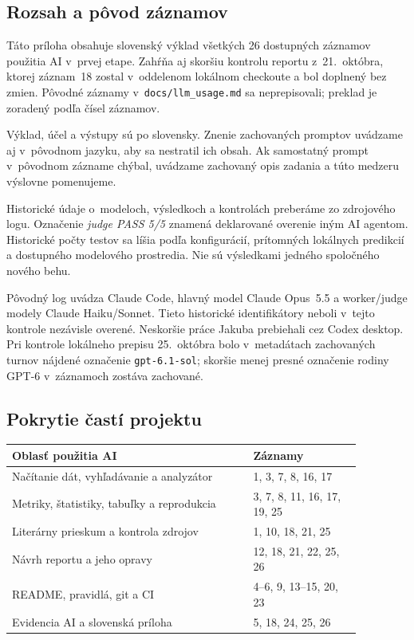 \begingroup
\normalsize
\setlength{\parindent}{0pt}
\subsection*{Rozsah a pôvod záznamov}
Táto príloha obsahuje slovenský výklad všetkých 26 dostupných záznamov použitia AI v~prvej etape. Zahŕňa aj skoršiu kontrolu reportu z~21.~októbra, ktorej záznam~18 zostal v~oddelenom lokálnom checkoute a bol doplnený bez zmien. Pôvodné záznamy v~\texttt{docs/llm\_usage.md} sa neprepisovali; preklad je zoradený podľa čísel záznamov.

Výklad, účel a výstupy sú po slovensky. Znenie zachovaných promptov uvádzame aj v~pôvodnom jazyku, aby sa nestratil ich obsah. Ak samostatný prompt v~pôvodnom zázname chýbal, uvádzame zachovaný opis zadania a túto medzeru výslovne pomenujeme.

Historické údaje o~modeloch, výsledkoch a kontrolách preberáme zo zdrojového logu. Označenie \emph{judge PASS 5/5} znamená deklarované overenie iným AI agentom. Historické počty testov sa líšia podľa konfigurácií, prítomných lokálnych predikcií a dostupného modelového prostredia. Nie sú výsledkami jedného spoločného nového behu.

Pôvodný log uvádza Claude Code, hlavný model Claude Opus~5.5 a worker/judge modely Claude Haiku/Sonnet. Tieto historické identifikátory neboli v~tejto kontrole nezávisle overené. Neskoršie práce Jakuba prebiehali cez Codex desktop. Pri kontrole lokálneho prepisu 25.~októbra bolo v~metadátach zachovaných turnov nájdené označenie \texttt{gpt-6.1-sol}; skoršie menej presné označenie rodiny GPT-6 v~záznamoch zostáva zachované.

\subsection*{Pokrytie častí projektu}
\begin{center}
\begin{tabular}{p{0.60\linewidth}p{0.27\linewidth}}
\toprule
Oblasť použitia AI & Záznamy \\
\midrule
Načítanie dát, vyhľadávanie a analyzátor & 1, 3, 7, 8, 16, 17 \\
Metriky, štatistiky, tabuľky a reprodukcia & 3, 7, 8, 11, 16, 17, 19, 25 \\
Literárny prieskum a kontrola zdrojov & 1, 10, 18, 21, 25 \\
Návrh reportu a jeho opravy & 12, 18, 21, 22, 25, 26 \\
README, pravidlá, git a CI & 4--6, 9, 13--15, 20, 23 \\
Evidencia AI a slovenská príloha & 5, 18, 24, 25, 26 \\
\bottomrule
\end{tabular}
\end{center}

